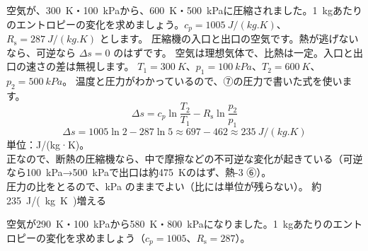 \label{ph:熱-6:ex12}
\begin{phreidai}[圧縮機を通る空気のエントロピー]
空気が、\qty{300}{K}・\qty{100}{kPa}から、\qty{600}{K}・\qty{500}{kPa}に圧縮されました。\qty{1}{kg}あたりのエントロピーの変化を求めましょう。$c_p=\qty{1005}{J/(kg.K)}$、$R_{\mathrm s}=\qty{287}{J/(kg.K)}$ とします。
\phbamen
圧縮機の入口と出口の空気です。熱が逃げないなら、可逆なら $\Delta s=0$ のはずです。
\phmushi
空気は理想気体で、比熱は一定。入口と出口の速さの差は無視します。
\phzu
$T_1=\qty{300}{K}$、$p_1=\qty{100}{kPa}$、$T_2=\qty{600}{K}$、$p_2=\qty{500}{kPa}$。
\phriyu
温度と圧力がわかっているので、⑦の圧力で書いた式を使います。
\phtateru
\[\Delta s=c_p\ln\frac{T_2}{T_1}-R_{\mathrm s}\ln\frac{p_2}{p_1}\]
\phtoku
\[\Delta s=1005\ln2-287\ln5\approx697-462\approx\qty{235}{J/(kg.K)}\]
\phtashikame
単位：J/(kg·K)。\\
正なので、断熱の圧縮機なら、中で摩擦などの不可逆な変化が起きている（可逆なら\qty{100}{kPa}→\qty{500}{kPa}で出口は約\qty{475}{K}のはず、熱-3 ⑥）。\\
圧力の比をとるので、kPa のままでよい（比には単位が残らない）。
\kotae 約\qty{235}{J/(kg.K)}増える
\end{phreidai}
\begin{jibun}
空気が\qty{290}{K}・\qty{100}{kPa}から\qty{580}{K}・\qty{800}{kPa}になりました。\qty{1}{kg}あたりのエントロピーの変化を求めましょう（$c_p=1005$、$R_{\mathrm s}=287$）。
\end{jibun}

